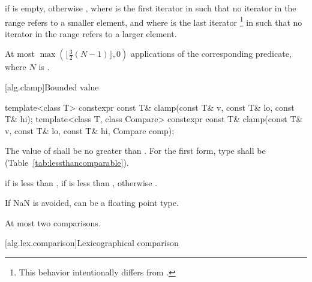 \begin{itemdescr}
\pnum
\returns
{} if  is empty, otherwise
, where  is
the first iterator in  such that no iterator in the range refers to a smaller element, and where  is the last iterator
\footnote{This behavior intentionally differs from .}
in  such that no iterator in the range refers to a larger element.

\pnum
\complexity
At most
$\max(\lfloor{\frac{3}{2}} (N-1)\rfloor, 0)$
applications of the corresponding predicate, where $N$ is .
\end{itemdescr}

[alg.clamp]{Bounded value}

%
\begin{itemdecl}
template<class T>
  constexpr const T& clamp(const T& v, const T& lo, const T& hi);
template<class T, class Compare>
  constexpr const T& clamp(const T& v, const T& lo, const T& hi, Compare comp);
\end{itemdecl}

\begin{itemdescr}
\pnum
\requires
The value of  shall be no greater than .
For the first form, type 
shall be  (Table~\ref{tab:lessthancomparable}).

\pnum
\returns
{} if  is less than ,
 if  is less than ,
otherwise .

\pnum
\begin{note}
If NaN is avoided,  can be a floating point type.
\end{note}

\pnum
\complexity
At most two comparisons.
\end{itemdescr}

[alg.lex.comparison]{Lexicographical comparison}

